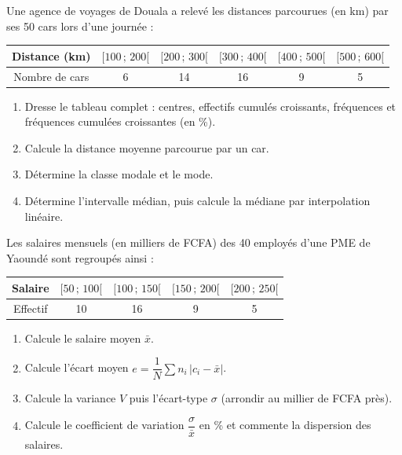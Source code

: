 \documentclass[11pt]{article}
\begin{document}
\begin{exercice}
Une agence de voyages de Douala a relevé les distances parcourues (en km) par ses 50 cars lors d'une journée :
\begin{center}
\begin{tabular}{|c|ccccc|}\hline
Distance (km) & $[100\,;\,200[$ & $[200\,;\,300[$ & $[300\,;\,400[$ & $[400\,;\,500[$ & $[500\,;\,600[$ \\ \hline
Nombre de cars & 6 & 14 & 16 & 9 & 5 \\ \hline
\end{tabular}
\end{center}
\begin{enumerate}
\item Dresse le tableau complet : centres, effectifs cumulés croissants, fréquences et fréquences cumulées croissantes (en \%).
\item Calcule la distance moyenne parcourue par un car.
\item Détermine la classe modale et le mode.
\item Détermine l'intervalle médian, puis calcule la médiane par interpolation linéaire.
\end{enumerate}
\end{exercice}

\begin{exercice}
Les salaires mensuels (en milliers de FCFA) des 40 employés d'une PME de Yaoundé sont regroupés ainsi :
\begin{center}
\begin{tabular}{|c|cccc|}\hline
Salaire & $[50\,;\,100[$ & $[100\,;\,150[$ & $[150\,;\,200[$ & $[200\,;\,250[$ \\ \hline
Effectif & 10 & 16 & 9 & 5 \\ \hline
\end{tabular}
\end{center}
\begin{enumerate}
\item Calcule le salaire moyen $\bar{x}$.
\item Calcule l'écart moyen $e = \dfrac{1}{N}\sum n_i\,|c_i - \bar{x}|$.
\item Calcule la variance $V$ puis l'écart-type $\sigma$ (arrondir au millier de FCFA près).
\item Calcule le coefficient de variation $\dfrac{\sigma}{\bar{x}}$ en \% et commente la dispersion des salaires.
\end{enumerate}
\end{exercice}
\end{document}
